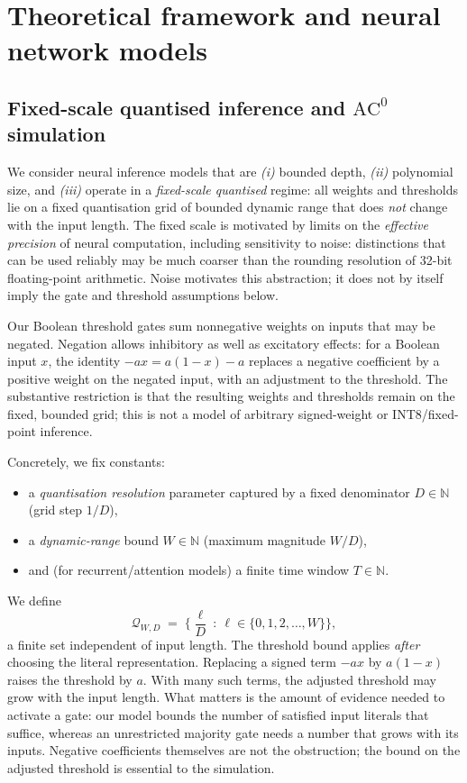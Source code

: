 \documentclass[11pt]{article}
\newcommand{\AC}{\mathrm{AC}}
\newcommand{\N}{\mathbb{N}}
\newcommand{\Qset}{\mathcal{Q}}
\theoremstyle{plain}
\theoremstyle{definition}
\theoremstyle{remark}
\numberwithin{equation}{section}
\begin{document}
\section{Theoretical framework and neural network models}
\label{sec:framework}

\subsection{Fixed-scale quantised inference and \texorpdfstring{$\AC^0$}{AC0} simulation}
\label{sec:framework-fixedprecision}

We consider neural inference models that are \emph{(i)} bounded depth, \emph{(ii)} polynomial size, and \emph{(iii)} operate in a \emph{fixed-scale quantised} regime:
all weights and thresholds lie on a fixed quantisation grid of bounded dynamic range that does \emph{not} change with the input length.
The fixed scale is motivated by limits on the \emph{effective precision} of neural computation, including sensitivity to noise: distinctions that can be used reliably may be much coarser than the rounding resolution of 32-bit floating-point arithmetic. Noise motivates this abstraction; it does not by itself imply the gate and threshold assumptions below.

Our Boolean threshold gates sum nonnegative weights on inputs that may be negated. Negation allows inhibitory as well as excitatory effects: for a Boolean input $x$, the identity $-ax=a(1-x)-a$ replaces a negative coefficient by a positive weight on the negated input, with an adjustment to the threshold. The substantive restriction is that the resulting weights and thresholds remain on the fixed, bounded grid; this is not a model of arbitrary signed-weight or INT8/fixed-point inference.

Concretely, we fix constants:
\begin{itemize}[leftmargin=*]
\item a \emph{quantisation resolution} parameter captured by a fixed denominator $D\in\N$ (grid step $1/D$),
\item a \emph{dynamic-range} bound $W\in\N$ (maximum magnitude $W/D$),
\item and (for recurrent/attention models) a finite time window $T\in\N$.
\end{itemize}
We define
\[
\Qset_{W,D} \;=\; \Big\{ \frac{\ell}{D}\ :\ \ell\in\{0,1,2,\dots,W\}\Big\},
\]
a finite set independent of input length.
The threshold bound applies \emph{after} choosing the literal representation. Replacing a signed term $-a x$ by $a(1-x)$ raises the threshold by $a$. With many such terms, the adjusted threshold may grow with the input length. What matters is the amount of evidence needed to activate a gate: our model bounds the number of satisfied input literals that suffice, whereas an unrestricted majority gate needs a number that grows with its inputs. Negative coefficients themselves are not the obstruction; the bound on the adjusted threshold is essential to the simulation.
\end{document}
